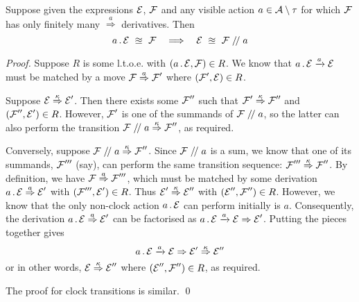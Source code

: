 \documentclass[orivec,envcountsame]{llncs}
\newcommand{\LTOC}{\approxeq}
\newcommand{\Does}[1]{\xderives{#1}}
\newcommand{\DoesTaus}{\mathrel{\Rightarrow}}
\newcommand{\Weak}[1]{\stackrel{#1}{\Rightarrow}}
\newcommand{\After}[1]{\mathrel{/\!/} #1}
\begin{document}
\begin{theorem}
\label{thm:cancellation}

Suppose given the expressions $\text{$\mathcal{E}$}$, $\text{$\mathcal{F}$}$ and any visible action $a \in
\text{$\mathcal{A}$}\setminus\tau$ for which $\text{$\mathcal{F}$}$ has only finitely many $\Weak{a}$
derivatives. Then
\[
    a\pref\expr ~\LTOC~ \exprb 
    \quad\Longrightarrow\quad 
    \expr ~\LTOC~ \exprb\After{a}
\]
\end{theorem}
\begin{proof}

Suppose $R$ is some l.t.o.e. with $(a\,.\,\text{$\mathcal{E}$},\text{$\mathcal{F}$}) \in R$. We know that
$a\pref\expr \Does{a} \expr$ must be matched by a move $\exprb \Weak{a} \exprb'$
where $(\text{$\mathcal{F}$}', \text{$\mathcal{E}$}) \in R$.

Suppose $\expr \Weak{\kappa} \expr'$. Then there exists some $\text{$\mathcal{F}$}''$ such
that $\exprb' \Weak{\kappa} \exprb''$ and $(\text{$\mathcal{F}$}'',\text{$\mathcal{E}$}') \in R$. However,
$\text{$\mathcal{F}$}'$ is one of the summands of $\exprb\After{a}$, so the latter can also
perform the transition $\exprb\After{a} \Weak{\kappa} \exprb''$, as required.

Conversely, suppose $\exprb\After{a} \Weak{\kappa} \exprb''$. Since $\exprb\After{a}$ is a sum, we know that one of its summands, $\text{$\mathcal{F}$}'''$ (say), can perform the same transition sequence: $\exprb''' \Weak{\kappa} \exprb''$. By definition, we have $\exprb \Weak{a} \exprb'''$, which must be matched by some derivation $a\pref\expr \Weak{a} \expr'$ with $(\text{$\mathcal{F}$}''', \text{$\mathcal{E}$}') \in R$. Thus $\expr' \Weak{\kappa} \expr''$ with $(\text{$\mathcal{E}$}'',\text{$\mathcal{F}$}'') \in R$. However, we know that the only non-clock action $a\,.\,\text{$\mathcal{E}$}$ can perform initially is $a$. Consequently, the derivation $a\pref\expr \Weak{a} \expr'$ can be factorised as $a\pref\expr \Does{a} \expr \DoesTaus \expr'$. Putting the pieces together gives
\[
    a\pref\expr \Does{a} \expr \DoesTaus \expr' \Weak{\kappa} \expr''
\]
or in other words, $\expr\Weak{\kappa} \expr''$ where $(\text{$\mathcal{E}$}'',\text{$\mathcal{F}$}'') \in R$, as required.

The proof for clock transitions is similar.
\qed \end{proof}



\end{document}
